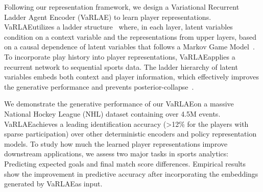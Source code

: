 \documentclass{article}
\newcommand{\system}{VaRLAE\;}
\begin{document}
Following our representation framework, we design a Variational Recurrent Ladder Agent Encoder (VaRLAE) to learn player representations. \system utilizes a ladder structure~\cite{SonderbyLadderVAE16} where, in each layer, latent variables condition on a context variable and the representations from upper layers, based on a causal dependence of latent variables that follows a Markov Game Model~\cite{Littman1994}. To incorporate play history into player representations, \system applies a recurrent network  %
to sequential sports data.
The ladder hierarchy of latent variables embeds both context and player information, which effectively improves the generative performance and prevents posterior-collapse~\cite{SonderbyLadderVAE16,HePosteriorCollapse19}.

We demonstrate the generative performance of our \system on a massive National Hockey League (NHL) dataset containing over 4.5M events. \system achieves a leading identification accuracy (>12\% for the players with sparse participation) over other deterministic encoders and policy representation models. 
To study how much the learned player representations improve downstream applications, we assess two major tasks in sports analytics: Predicting expected goals and final match score differences. 
Empirical results show the improvement in predictive accuracy after incorporating the embeddings generated by \system as input. 

\end{document}
